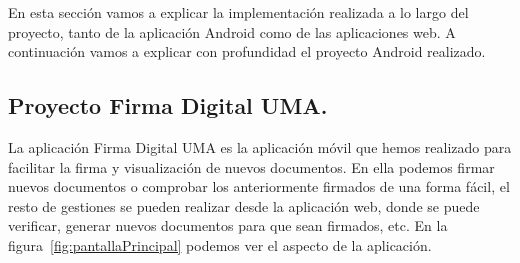 En esta sección vamos a explicar la implementación realizada a lo largo del proyecto, tanto de la aplicación Android como de las aplicaciones web. A continuación vamos a explicar con profundidad el proyecto Android realizado.

\subsection{Proyecto Firma Digital UMA.}

La aplicación Firma Digital UMA es la aplicación móvil que hemos realizado para facilitar la firma y visualización de nuevos documentos. En ella  podemos firmar nuevos documentos o comprobar los anteriormente firmados de una forma fácil, el resto de gestiones se pueden realizar desde la aplicación web, donde se puede verificar, generar nuevos documentos para que sean firmados, etc. En la figura~\ref{fig:pantallaPrincipal} podemos ver el aspecto de la aplicación.

